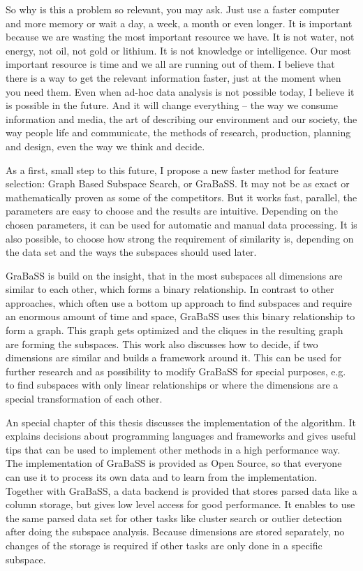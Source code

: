 So why is this a problem so relevant, you may ask. Just use a faster computer and more memory or wait a day, a week, a month or even longer. It is important because we are wasting the most important resource we have. It is not water, not energy, not oil, not gold or lithium. It is not knowledge or intelligence. Our most important resource is time and we all are running out of them. I believe that there is a way to get the relevant information faster, just at the moment when you need them. Even when ad-hoc data analysis is not possible today, I believe it is possible in the future. And it will change everything -- the way we consume information and media, the art of describing our environment and our society, the way people life and communicate, the methods of research, production, planning and design, even the way we think and decide.

As a first, small step to this future, I propose a new faster method for feature selection: Graph Based Subspace Search, or GraBaSS. It may not be as exact or mathematically proven as some of the competitors. But it works fast, parallel, the parameters are easy to choose and the results are intuitive. Depending on the chosen parameters, it can be used for automatic and manual data processing. It is also possible, to choose how strong the requirement of similarity is, depending on the data set and the ways the subspaces should used later.

GraBaSS is build on the insight, that in the most subspaces all dimensions are similar to each other, which forms a binary relationship. In contrast to other approaches, which often use a bottom up approach to find subspaces and require an enormous amount of time and space, GraBaSS uses this binary relationship to form a graph. This graph gets optimized and the cliques in the resulting graph are forming the subspaces. This work also discusses how to decide, if two dimensions are similar and builds a framework around it. This can be used for further research and as possibility to modify GraBaSS for special purposes, e.g. to find subspaces with only linear relationships or where the dimensions are a special transformation of each other.

An special chapter of this thesis discusses the implementation of the algorithm. It explains decisions about programming languages and frameworks and gives useful tips that can be used to implement other methods in a high performance way. The implementation of GraBaSS is provided as Open Source, so that everyone can use it to process its own data and to learn from the implementation. Together with GraBaSS, a data backend is provided that stores parsed data like a column storage, but gives low level access for good performance. It enables to use the same parsed data set for other tasks like cluster search or outlier detection after doing the subspace analysis. Because dimensions are stored separately, no changes of the storage is required if other tasks are only done in a specific subspace.
